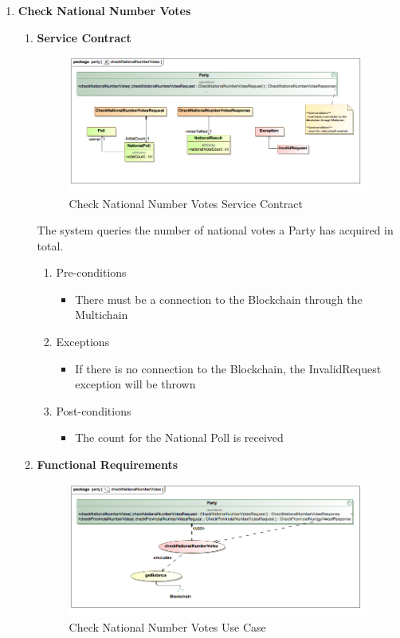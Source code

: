 \begin{enumerate}
	\item \textbf{Check National Number Votes}
		\begin{enumerate}
			\item \textbf{Service Contract}
				\begin{figure}[H]
					\centering
					\includegraphics[width=0.75\linewidth]{../Images/Party/ServiceContracts/CheckNationalNumberVotes_ServiceContract.png}
					\caption{Check National Number Votes Service Contract}
				\end{figure}
				
				The system queries the number of national votes a Party has acquired in total.
				\newline				
				\begin{enumerate}
					\item Pre-conditions
					\begin{itemize}
						\item There must be a connection to the Blockchain through the Multichain
					\end{itemize}
					
					\item Exceptions
					\begin{itemize}
						\item If there is no connection to the Blockchain, the InvalidRequest exception will be thrown
					\end{itemize}
					
					\item Post-conditions
					\begin{itemize}
						\item The count for the National Poll is received
					\end{itemize}
				\end{enumerate}
			
			\item \textbf{Functional Requirements}
				\begin{figure}[H]
					\centering
					\includegraphics[width=0.75\linewidth]{../Images/Party/UseCases/CheckNationalNumberVotes_UseCase.png}
					\caption{Check National Number Votes Use Case}
				\end{figure}
				

\end{enumerate}
\end{enumerate}
